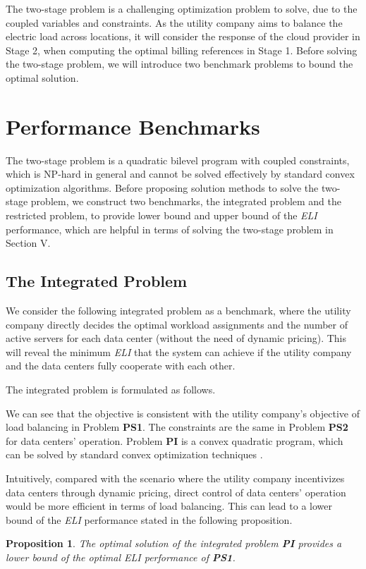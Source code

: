 \documentclass[journal]{IEEEtran}
\newtheorem{proposition}{Proposition}
\begin{document}
	The two-stage problem is a challenging optimization problem to solve, due to the coupled variables and constraints. As the utility company aims to balance the electric load across locations, it will consider the response of the cloud provider in Stage 2, when computing the optimal billing references  in Stage 1. Before solving the two-stage problem, we will introduce two benchmark problems to bound the optimal solution. 
		
		
	
	\section{Performance Benchmarks}
	The two-stage problem is a quadratic bilevel program with coupled constraints, which is NP-hard in general and cannot be solved effectively by standard convex optimization algorithms. Before proposing solution methods to solve the two-stage problem, we construct two benchmarks, the integrated problem and the restricted problem, to provide lower bound and upper bound of the \emph{ELI} performance, which are helpful in terms of solving the two-stage problem in Section V.
	

	\subsection{The Integrated Problem}
	We consider the following integrated problem as a benchmark, where the utility company directly decides the optimal workload assignments and the number of active servers for each data center (without the need of dynamic pricing). This will reveal the minimum \emph{ELI} that the system can achieve if the utility company and the data centers fully cooperate with each other.
	
	The integrated problem is formulated as follows.
	
	
	
	We can see that the objective is consistent with the utility company's objective of load balancing in Problem \textbf{PS1}. The constraints are the same in Problem \textbf{PS2} for data centers' operation. Problem \textbf{PI} is a convex quadratic program, which can be solved by standard convex optimization techniques \cite{convex}. 
	
	Intuitively, compared with the scenario where the utility company incentivizes data centers through dynamic pricing, direct control of data centers' operation would be more efficient in terms of load balancing. This can lead to a lower bound of the \emph{ELI} performance stated in the following proposition.
	\begin{proposition}\label{lowerbound}
		The optimal solution of the integrated problem \textbf{PI} provides a lower bound of the optimal \emph{ELI} performance of \textbf{PS1}.
	\end{proposition}
	
\end{document}
